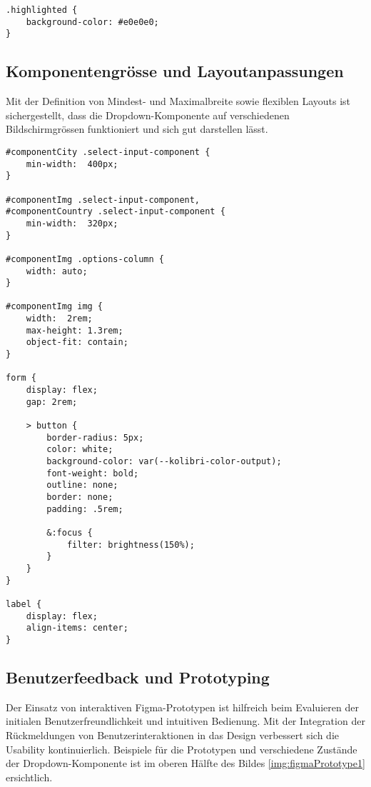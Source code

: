 \begin{lstlisting}[style = htmlcssjs, caption = Style Beispiel für Zustand Highlight, label = code:styleExample]
.highlighted {
    background-color: #e0e0e0; 
}
\end{lstlisting}


\subsection{Komponentengrösse und Layoutanpassungen}

Mit der Definition von Mindest- und Maximalbreite sowie flexiblen Layouts ist sichergestellt, 
dass die Dropdown-Komponente auf verschiedenen Bildschirmgrössen funktioniert und sich gut darstellen lässt.

\begin{lstlisting}[style = htmlcssjs, caption = Flexible Layouts für Demo-Page, label = code:layoutDemoPage]
#componentCity .select-input-component {
    min-width:  400px;
}

#componentImg .select-input-component,
#componentCountry .select-input-component {
    min-width:  320px;
}

#componentImg .options-column {
    width: auto;
}

#componentImg img {
    width:  2rem;
    max-height: 1.3rem;
    object-fit: contain;
}

form {
    display: flex;
    gap: 2rem;

    > button {
        border-radius: 5px;
        color: white;
        background-color: var(--kolibri-color-output);
        font-weight: bold;
        outline: none;
        border: none;
        padding: .5rem;

        &:focus {
            filter: brightness(150%);
        }
    }
}

label {
    display: flex;
    align-items: center;
}
\end{lstlisting}


\subsection{Benutzerfeedback und Prototyping}

Der Einsatz von interaktiven Figma-Prototypen ist hilfreich beim Evaluieren der initialen Benutzerfreundlichkeit und intuitiven Bedienung. 
Mit der Integration der Rückmeldungen von Benutzerinteraktionen in das Design verbessert sich die Usability kontinuierlich.
Beispiele für die Prototypen und verschiedene Zustände der Dropdown-Komponente ist im oberen Hälfte des Bildes \ref{img:figmaPrototype1} ersichtlich.

